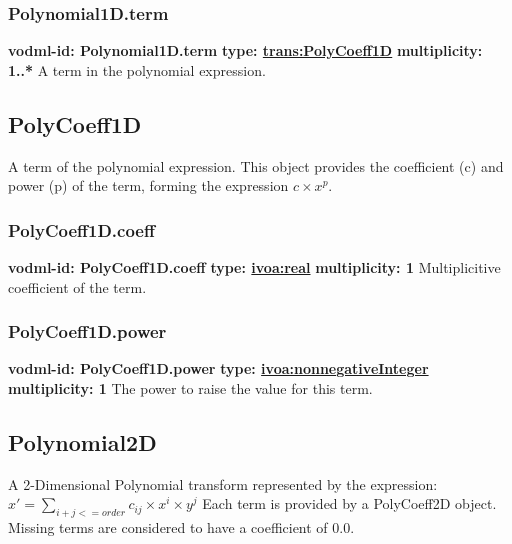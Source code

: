     \subsubsection{Polynomial1D.term}
      \textbf{vodml-id: Polynomial1D.term} \newline
      \textbf{type: \hyperref[sect:PolyCoeff1D]{trans:PolyCoeff1D}} \newline
      \textbf{multiplicity: 1..*} \newline 
      A term in the polynomial expression.

  \subsection{PolyCoeff1D}
  \label{sect:PolyCoeff1D}
    A term of the polynomial expression. This object provides the coefficient (c) and power (p) of the term, forming the expression $c \times x^{p}$.

    \subsubsection{PolyCoeff1D.coeff}
      \textbf{vodml-id: PolyCoeff1D.coeff} \newline
      \textbf{type: \hyperref[sect:ivoa]{ivoa:real}} \newline
      \textbf{multiplicity: 1} \newline 
      Multiplicitive coefficient of the term.

    \subsubsection{PolyCoeff1D.power}
      \textbf{vodml-id: PolyCoeff1D.power} \newline
      \textbf{type: \hyperref[sect:ivoa]{ivoa:nonnegativeInteger}} \newline
      \textbf{multiplicity: 1} \newline 
      The power to raise the value for this term.

  \subsection{Polynomial2D}
  \label{sect:Polynomial2D}
    A 2-Dimensional Polynomial transform represented by the expression:
    \indent $x' = \sum_{i+j<=order} c_{ij}\times x^{i}\times y^{j}$ \newline
    Each term is provided by a PolyCoeff2D object. Missing terms are considered to have a coefficient of 0.0.


